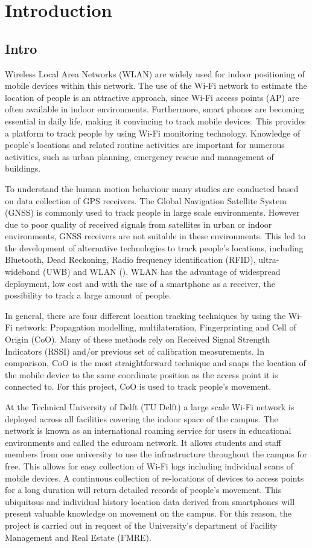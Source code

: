 \chapter{Introduction}\label{introduction}
\section{Intro}\label{intro}
Wireless Local Area Networks (WLAN) are widely used for indoor positioning of mobile devices within this network. The use of the Wi-Fi network to estimate the location of people is an attractive approach, since Wi-Fi access points (AP) are often available in indoor environments. Furthermore, smart phones are becoming essential in daily life, making it convincing to track mobile devices. This provides a platform to track people by using Wi-Fi monitoring technology. Knowledge of people’s locations and related routine activities are important for numerous activities, such as urban planning, emergency rescue and management of buildings.

To understand the human motion behaviour many studies are conducted based on data collection of GPS receivers. The Global Navigation Satellite System (GNSS) is commonly used to track people in large scale environments. However due to poor quality of received signals from satellites in urban or indoor environments, GNSS receivers are not suitable in these environments. This led to the development of alternative technologies to track people’s locations, including Bluetooth, Dead Reckoning, Radio frequency identification (RFID), ultra-wideband (UWB) and WLAN (\cite{mautz2012indoor}). WLAN has the advantage of widespread deployment, low cost and with the use of a smartphone as a receiver, the possibility to track a large amount of people.  

In general, there are four different location tracking techniques by using the Wi-Fi network: Propagation modelling, multilateration, Fingerprinting and Cell of Origin (CoO). Many of these methods rely on Received Signal Strength Indicators (RSSI) and/or previous set of calibration measurements. In comparison, CoO is the most straightforward technique and snaps the location of the mobile device to the same coordinate position as the access point it is connected to. For this project, CoO is used to track people’s movement.

At the Technical University of Delft (TU Delft) a large scale Wi-Fi network is deployed across all facilities covering the indoor space of the campus. The network is known as an international roaming service for users in educational environments and called the eduroam network. It allows students and staff members from one university to use the infrastructure throughout the campus for free. This allows for easy collection of Wi-Fi logs including individual scans of mobile devices.  A continuous collection of re-locations of devices to access points for a long duration will return detailed records of people’s movement. This ubiquitous and individual history location data derived from smartphones will present valuable knowledge on movement on the campus. For this reason, the project is carried out in request of the University’s department of Facility Management and Real Estate (FMRE). 


